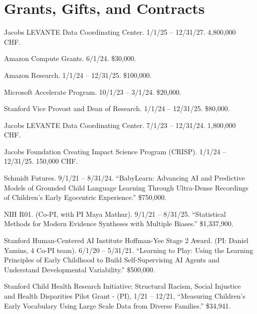 \documentclass{article}
\renewenvironment{itemize}{
\begin{list}{}{
  \setlength{\leftmargin}{1.5em}
  }
  }{
\end{list}
}
\begin{document}
\section*{Grants, Gifts, and Contracts}

\begin{itemize}

  \item Jacobs LEVANTE Data Coordinating Center. 1/1/25 -- 12/31/27. 4,800,000 CHF.

  \item Amazon Compute Grants. 6/1/24. \$30,000.
  
  \item Amazon Research. 1/1/24 -- 12/31/25.  \$100,000.

  \item Microsoft Accelerate Program. 10/1/23 -- 3/1/24.  \$20,000.

  \item Stanford Vice Provost and Dean of Research.  1/1/24 -- 12/31/25. \$80,000.

  \item Jacobs LEVANTE Data Coordinating Center. 7/1/23 -- 12/31/24.  1,800,000 CHF.

  \item Jacobs Foundation Creating Impact Science Program (CRISP). 1/1/24 -- 12/31/25.  150,000 CHF.

  \item Schmidt Futures. 9/1/21 -- 8/31/24. ``BabyLearn: Advancing AI and Predictive Models of Grounded Child Language Learning Through Ultra-Dense Recordings of Children’s Early Egocentric Experience.'' \$750,000.

  \item NIH R01. (Co-PI, with PI Maya Mathur). 9/1/21 -- 8/31/25. ``Statistical Methods for Modern Evidence Syntheses with Multiple Biases.'' \$1,337,900. 

  \item Stanford Human-Centered AI Institute Hoffman-Yee Stage 2 Award. (PI: Daniel Yamins, 4 Co-PI team). 6/1/20 -- 5/31/21. ``Learning to Play: Using the Learning Principles of Early Childhood to Build Self-Supervising AI Agents and Understand Developmental Variability.'' \$500,000.

  \item Stanford Child Health Research Initiative: Structural Racism, Social Injustice and Health Disparities Pilot Grant -  (PI),  1/21 -- 12/21, ``Measuring Children's Early Vocabulary Using Large Scale Data from Diverse
Families.''  \$34,941.


\end{itemize}
\end{document}
